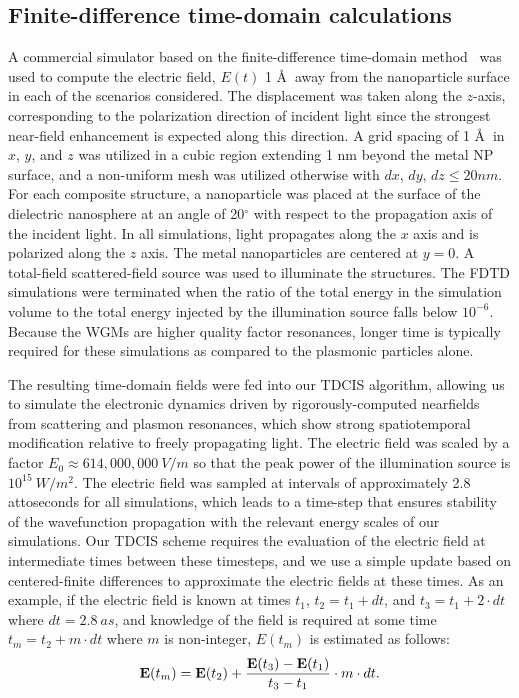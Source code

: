 \documentclass[journal=jpclcd,manuscript=letter]{achemso}
\begin{document}
\subsection{Finite-difference time-domain calculations}
A commercial simulator based on the finite-difference time-domain method~\cite{Lumerical} was used to compute the electric field, $E(t)$
1 \AA $\:$  
away from the nanoparticle surface in each of the scenarios considered.  The displacement
was taken along the $z$-axis, corresponding to the polarization direction of incident light since the strongest
near-field enhancement is expected along this direction.  A grid spacing of 1 \AA $\:$  
in $x$, $y$, and $z$ was utilized
in a cubic region extending 1 nm beyond the metal NP surface, and a non-uniform mesh was utilized otherwise with $dx$, $dy$, $dz \leq 20 nm$.
For each composite structure, a nanoparticle was placed at the surface of the dielectric nanosphere at an angle of
20$^{\circ}$ with respect to the propagation axis of the incident light. In all simulations, light propagates
along the $x$ axis and is polarized along the $z$ axis.  The metal nanoparticles are centered at $y=0$.  
A total-field scattered-field source was used to illuminate the structures.  The FDTD simulations were terminated when the 
ratio of the total energy in the simulation volume to the total energy injected by the illumination source falls below
$10^{-6}$.  Because the WGMs are higher quality factor resonances, longer time is typically required for these simulations
as compared to the plasmonic particles alone.  

The resulting time-domain fields were fed into our TDCIS algorithm, allowing us to simulate the electronic dynamics
driven by rigorously-computed nearfields from scattering and plasmon resonances, which show strong spatiotemporal modification relative
to freely propagating light.  The electric field was scaled by a factor $E_0 \approx 614,000,000 \: V/m$ so that the peak power
of the illumination source is $10^{15} \: W/m^2$.  The electric field was sampled at intervals of approximately 2.8 attoseconds for all simulations, which leads
to a time-step that ensures stability of
the wavefunction propagation with the relevant energy scales of our simulations.  Our TDCIS scheme
requires the evaluation of the electric field at intermediate times between these timesteps, and we use a simple update
based on centered-finite differences to approximate the electric fields at these times.  As an example, if the 
electric field is known at times $t_1$, $t_2 = t_1 + dt$, and $t_3 = t_1 + 2\cdot dt$ where $dt = 2.8 \: as$, and knowledge
of the field is required at some time $t_m = t_2 + m\cdot dt$ where $m$ is non-integer, $E(t_m)$ is estimated as follows: 
\begin{equation}
{\bf E}(t_m) =  {\bf E}(t_2) + \frac{{\bf E}(t_3)-{\bf E}(t_1) }{t_3 - t_1 } \cdot m\cdot dt.
\end{equation}
\end{document}
